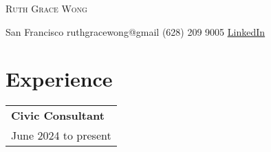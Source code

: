 \documentclass[letterpaper, oneside, final]{scrartcl} %
\begin{document}
\setlength{\pdfpagewidth}{8.5in}
\setlength{\pdfpageheight}{11in}

\begin{center} %


{\fontsize{36}{36}\spaceskip=12pt\selectfont\scshape Ruth Grace Wong} %

\vspace{1cm} %

{\renewcommand{\headfont}{\normalfont\rmfamily\scshape} %
\fontsize{12.5}{17}\selectfont\scshape %

San Francisco  {\large\textperiodcentered} ruthgracewong@gmail {\large\textperiodcentered} (628) 209 9005 {\large\textperiodcentered} \underline{\href{https://www.linkedin.com/in/ruthgracewong/}{LinkedIn}}
}

\vspace{0.2cm}


\section{Experience}

\renewcommand{\arraystretch}{1.3}

\begingroup\setlength{\fboxsep}{0pt}
\colorbox{mygray}{
\begin{flushleft}
\begin{tabularx}{\textwidth}{l}
\textbf{Civic Consultant}\\
June 2024 to present\\
\end{tabularx}
\end{flushleft}
}\endgroup
\vspace{-0.1cm}
\begin{itemize} \itemsep-0.2cm


\end{itemize}
\end{center}
\end{document}

